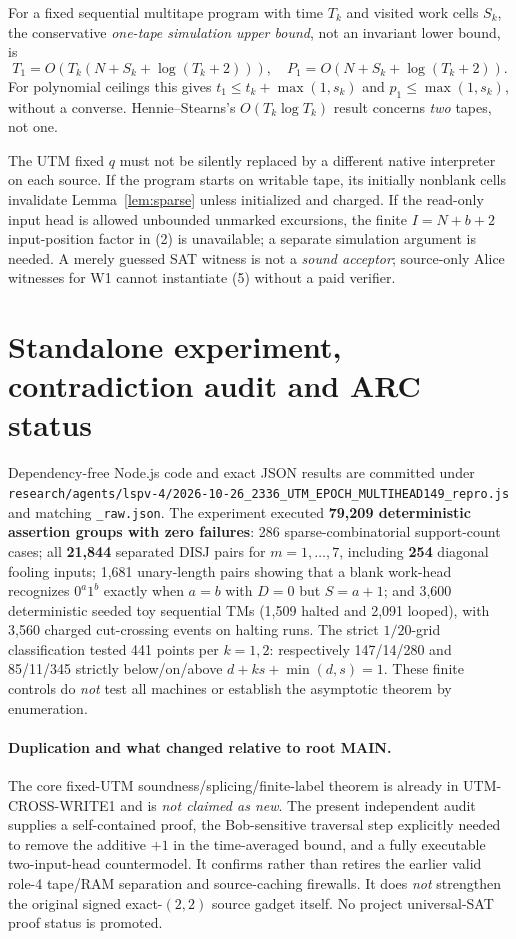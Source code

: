 \documentclass[11pt]{article}
\begin{document}
For a fixed sequential multitape program with time $T_k$ and
visited work cells $S_k$, the conservative \emph{one-tape
simulation upper bound}, not an invariant lower bound, is
\[
 T_1=O(T_k(N+S_k+\log(T_k+2))),\quad
 P_1=O(N+S_k+\log(T_k+2)).
\]
For polynomial ceilings this gives
$t_1\le t_k+\max(1,s_k)$ and
$p_1\le\max(1,s_k)$, without a converse.
Hennie--Stearns's $O(T_k\log T_k)$ result concerns
\emph{two} tapes, not one. \cite{hs}

The UTM fixed $q$ must not be silently replaced by
a different native interpreter on each source.
If the program starts on writable tape, its initially
nonblank cells invalidate Lemma~\ref{lem:sparse}
unless initialized and charged. If the read-only input
head is allowed unbounded unmarked excursions, the
finite $I=N+b+2$ input-position factor in (2) is
unavailable; a separate simulation argument is needed.
A merely guessed SAT witness is not a \emph{sound
acceptor}; source-only Alice witnesses for W1 cannot
instantiate (5) without a paid verifier.

\section{Standalone experiment, contradiction audit and ARC status}
Dependency-free Node.js code and exact JSON results are committed under
\texttt{research/agents/lspv-4/2026-10-26\_2336\_UTM\_EPOCH\_MULTIHEAD149\_repro.js}
and matching \texttt{\_raw.json}. The experiment executed
\textbf{79,209 deterministic assertion groups with zero failures}:
286 sparse-combinatorial support-count cases;
all \textbf{21,844} separated DISJ pairs for $m=1,\ldots,7$,
including \textbf{254} diagonal fooling inputs;
1,681 unary-length pairs showing that a blank work-head
recognizes $0^a1^b$ exactly when $a=b$ with $D=0$ but
$S=a+1$; and 3,600 deterministic seeded toy sequential
TMs (1,509 halted and 2,091 looped), with 3,560
charged cut-crossing events on halting runs.
The strict $1/20$-grid classification tested 441 points
per $k=1,2$: respectively 147/14/280 and 85/11/345
strictly below/on/above $d+ks+\min(d,s)=1$.
These finite controls do \emph{not} test all machines or
establish the asymptotic theorem by enumeration.

\paragraph{Duplication and what changed relative to root MAIN.}
The core fixed-UTM soundness/splicing/finite-label theorem
is already in UTM-CROSS-WRITE1 and is \emph{not claimed
as new}. The present independent audit supplies a
self-contained proof, the Bob-sensitive traversal step
explicitly needed to remove the additive $+1$ in the
time-averaged bound, and a fully executable two-input-head
countermodel. It confirms rather than retires the
earlier valid role-4 tape/RAM separation and
source-caching firewalls. It does \emph{not} strengthen
the original signed exact-$(2,2)$ source gadget itself.
No project universal-SAT proof status is promoted.
\end{document}
